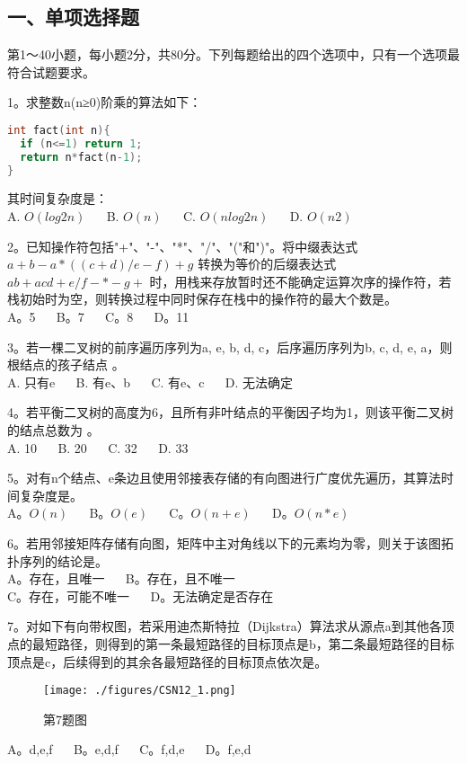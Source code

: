 
\subsection{一、单项选择题}
第1～40小题，每小题2分，共80分。下列每题给出的四个选项中，只有一个选项最符合试题要求。

1。求整数n(n≥0)阶乘的算法如下： \\
\begin{lstlisting}[language=cpp]
int fact(int n){
  if (n<=1) return 1;
  return n*fact(n-1);
}
\end{lstlisting}
其时间复杂度是：\\
A. $O(log2n)$ $\quad$ B. $O(n)$ $\quad$ C. $O(nlog2n)$ $\quad$ D. $O(n2)$

2。已知操作符包括"+"、"-"、"*"、"/"、"("和")"。将中缀表达式 $a+b-a*((c+d)/e-f)+g$ 转换为等价的后缀表达式 $ab+acd+e/f-*-g+$ 时，用栈来存放暂时还不能确定运算次序的操作符，若栈初始时为空，则转换过程中同时保存在栈中的操作符的最大个数是。 \\
A。5 $\quad$ B。7 $\quad$ C。8 $\quad$ D。11

3。若一棵二叉树的前序遍历序列为a, e, b, d, c，后序遍历序列为b, c, d, e, a，则根结点的孩子结点 。 \\
A. 只有e $\quad$ B. 有e、b $\quad$ C. 有e、c $\quad$ D. 无法确定

4。若平衡二叉树的高度为6，且所有非叶结点的平衡因子均为1，则该平衡二叉树的结点总数为 。 \\
A. 10 $\quad$ B. 20 $\quad$ C. 32 $\quad$ D. 33

5。对有n个结点、e条边且使用邻接表存储的有向图进行广度优先遍历，其算法时间复杂度是。\\
A。$O(n)$ $\quad$ B。$O(e)$ $\quad$ C。$O(n+e)$ $\quad$ D。$O(n*e)$

6。若用邻接矩阵存储有向图，矩阵中主对角线以下的元素均为零，则关于该图拓扑序列的结论是。\\
A。存在，且唯一 $\quad$ B。存在，且不唯一\\
C。存在，可能不唯一 $\quad$ D。无法确定是否存在

7。对如下有向带权图，若采用迪杰斯特拉（Dijkstra）算法求从源点a到其他各顶点的最短路径，则得到的第一条最短路径的目标顶点是b，第二条最短路径的目标顶点是c，后续得到的其余各最短路径的目标顶点依次是。\\
\begin{figure}[ht]
\centering
\texttt{[image: ./figures/CSN12\_1.png]}
\caption{第7题图} \label{CSN12_fig1}
\end{figure}
A。d,e,f $\quad$ B。e,d,f $\quad$ C。f,d,e $\quad$ D。f,e,d

